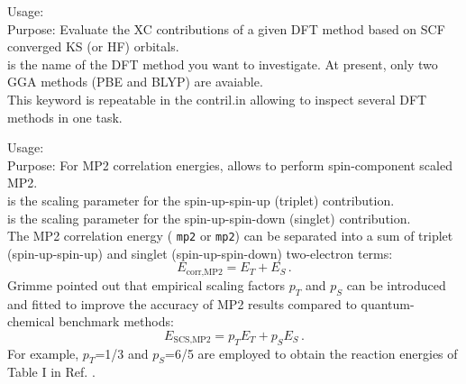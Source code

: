 {
 \noindent
  Usage:   \\[1.0ex]
  Purpose: Evaluate the XC contributions of a given DFT method based on SCF converged KS (or HF) orbitals.\\[1.0ex]
   is the name of the DFT method you want to investigate. At present, only two
  GGA methods (PBE and BLYP) are avaiable.\\
}
This keyword  is repeatable in the contril.in allowing to inspect several DFT methods
in one task.

{
 \noindent
  Usage:    \\[1.0ex]
  Purpose: For MP2 correlation energies, allows to perform
    spin-component scaled MP2. \\[1.0ex]
   is the scaling parameter for the spin-up-spin-up
    (triplet) contribution. \\
   is the scaling parameter for the spin-up-spin-down
    (singlet) contribution. \\
}
The MP2 correlation energy (
\texttt{mp2} or  \texttt{mp2}) can
be separated into a sum of triplet (spin-up-spin-up) and singlet
(spin-up-spin-down) two-electron terms:
\begin{equation}
  E_\text{corr,MP2} = E_T + E_S \, .
\end{equation}
Grimme \cite{Grimme03} pointed out that empirical scaling factors
$p_T$ and $p_S$ can be introduced and fitted to improve the accuracy
of MP2 results compared to quantum-chemical benchmark methods:
\begin{equation}
  E_\text{SCS,MP2} = p_T E_T + p_S E_S \, .
\end{equation}
For example, $p_T$=1/3 and $p_S$=6/5 are employed to obtain the
reaction energies of Table I in Ref. \cite{Grimme03}.

